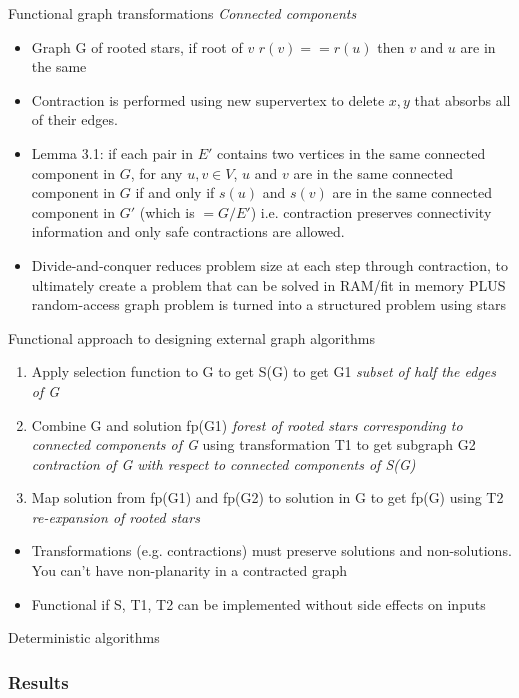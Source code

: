 Functional graph transformations
\textit{Connected components}
\begin{itemize}
    \item Graph G of rooted stars, if root of $v$ $r(v) == r(u)$ then $v$ and $u$ are in the same 
    \item Contraction is performed using new supervertex to delete ${x, y}$ that absorbs all of their edges.
    \item Lemma 3.1: if each pair in $E\prime$ contains two vertices in the same connected component in $G$, for any $u, v \in V$, $u$ and $v$ are in the same connected component in $G$ if and only if $s(u)$ and $s(v)$ are in the same connected component in $G\prime$ (which is $=G/E\prime$) i.e. contraction preserves connectivity information and only safe contractions are allowed.
    \item Divide-and-conquer reduces problem size at each step through contraction, to ultimately create a problem that can be solved in RAM/fit in memory PLUS random-access graph problem is turned into a structured problem using stars
\end{itemize}

Functional approach to designing external graph algorithms
\begin{enumerate}
    \item Apply selection function to G to get S(G) to get G1 \textit{subset of half the edges of G}
    \item Combine G and solution fp(G1) \textit{forest of rooted stars corresponding to connected components of G} using transformation T1 to get subgraph G2 \textit{contraction of G with respect to connected components of S(G)}
    \item Map solution from fp(G1) and fp(G2) to solution in G to get fp(G) using T2 \textit{re-expansion of rooted stars}
\end{enumerate}
\begin{itemize}
    \item Transformations (e.g. contractions) must preserve solutions and non-solutions. You can't have non-planarity in a contracted graph 
    \item Functional if S, T1, T2 can be implemented without side effects on inputs
\end{itemize}

Deterministic algorithms


\subsubsection{Results}

